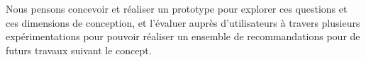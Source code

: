 Nous pensons concevoir et réaliser un prototype pour explorer ces questions et ces dimensions de conception, et l'évaluer auprès d'utilisateurs à travers plusieurs expérimentations pour pouvoir réaliser un ensemble de recommandations pour de futurs travaux suivant le concept.









